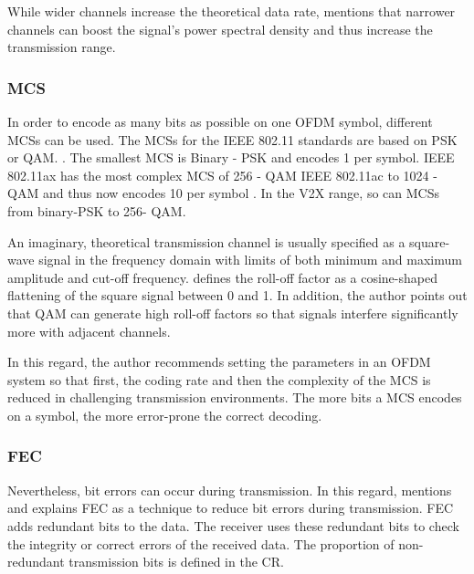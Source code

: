 While wider channels increase the theoretical data rate, \textcite{avallone_will_2021} mentions that narrower channels can
boost the signal's power spectral density and thus increase the transmission range.

\subsubsection*{\acf{MCS}}

In order to encode as many bits as possible on one \ac{OFDM} symbol, different \ac{MCS}s can be used.
The \ac{MCS}s for the IEEE 802.11 standards are based on \ac{PSK} or \ac{QAM}. \cite{kauffels_wireless_2002}.
The smallest \ac{MCS} is Binary - \ac{PSK} and encodes \SI{1}{\bit} per symbol.
IEEE 802.11ax has the most complex \ac{MCS} of \num{256} - \ac{QAM} IEEE 802.11ac to \num{1024} - \ac{QAM} and thus now encodes \SI{10}{\bit} per symbol \cite{afaqui_ieee_2017}.
In the \ac{V2X} range, so can \ac{MCS}s from binary-\ac{PSK} to \num{256}- \ac{QAM}.

An imaginary, theoretical transmission channel is usually specified as a square-wave signal in the frequency domain
with limits of both minimum and maximum amplitude and cut-off frequency. \textcite{kauffels_wireless_2002} defines
the roll-off factor as a cosine-shaped flattening of the square signal between 0 and 1.
In addition, the author points
out that \ac{QAM} can generate high roll-off factors so that signals interfere significantly more with adjacent channels.

In this regard, the author recommends setting the parameters in an \ac{OFDM} system so that first, the coding
rate and then the complexity of the \ac{MCS} is reduced in challenging transmission environments. The more bits a \ac{MCS} encodes
on a symbol, the more error-prone the correct decoding.

\subsubsection*{\acf{FEC}}

Nevertheless, bit errors can occur during transmission. In this regard, \cite{kauffels_wireless_2002}
mentions and explains \ac{FEC} as a technique to reduce bit errors during transmission. \ac{FEC} adds redundant bits
to the data. The receiver uses these redundant bits to check the integrity or correct errors of the received data.
The proportion of non-redundant transmission bits is defined in the \ac{CR}.

